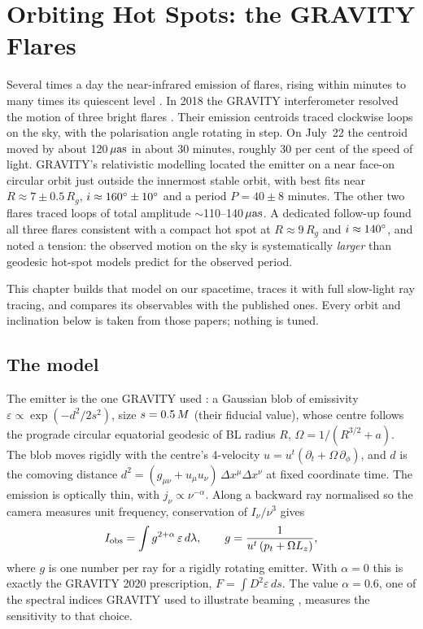 \chapter{Orbiting Hot Spots: the GRAVITY Flares}
\label{ch:xflares}

Several times a day the near-infrared emission of \sgra{} flares, rising
within minutes to many times its quiescent level \citep{Genzel2010}. In 2018
the GRAVITY interferometer resolved the motion of three bright flares
\citep{Gravity2018flares}. Their emission centroids traced clockwise loops on
the sky, with the polarisation angle rotating in step. On July~22 the
centroid moved by about 120\,$\mu\mathrm{as}$ in about 30 minutes, roughly 30 per cent
of the speed of light. GRAVITY's relativistic modelling located the emitter on
a near face-on circular orbit just outside the innermost stable orbit, with
best fits near $R \approx 7\pm0.5\,R_g$, $i \approx 160^\circ\pm10^\circ$ and a
period $P = 40\pm8$ minutes. The other two flares traced loops of total
amplitude $\sim$110--140\,$\mu\mathrm{as}$. A dedicated follow-up
\citep{Gravity2020flares} found all three flares consistent with a compact
hot spot at $R \approx 9\,R_g$ and $i \approx 140^\circ$, and noted a tension:
the observed motion on the sky is systematically \emph{larger} than geodesic
hot-spot models predict for the observed period.

This chapter builds that model on our \sgra{} spacetime, traces it with full
slow-light ray tracing, and compares its observables with the published
ones. Every orbit and inclination below is taken from those papers; nothing
is tuned.

\section{The model}

The emitter is the one GRAVITY used \citep[][following
\citealt{BroderickLoeb2006, Hamaus2009}]{Gravity2020flares}: a Gaussian blob
of emissivity $\varepsilon \propto \exp(-d^2/2s^2)$, size $s = 0.5\,M$
(their fiducial value), whose centre follows the prograde circular equatorial
geodesic of BL radius $R$, $\Omega = 1/(R^{3/2} + a)$. The blob moves rigidly
with the centre's 4-velocity $u = u^t(\partial_t + \Omega\,\partial_\phi)$, and
$d$ is the comoving distance $d^2 = (g_{\mu\nu} + u_\mu u_\nu)\,\Delta x^\mu
\Delta x^\nu$ at fixed coordinate time. The emission is optically thin, with
$j_\nu \propto \nu^{-\alpha}$. Along a backward ray normalised so the camera
measures unit frequency, conservation of $I_\nu/\nu^3$ gives
\begin{equation}
I_{\rm obs} = \int g^{2+\alpha}\,\varepsilon\,d\lambda, \qquad
g = \frac{1}{u^t\,(p_t + \Omega L_z)},
\label{eq:spotintensity}
\end{equation}
where $g$ is one number per ray for a rigidly rotating emitter. With
$\alpha = 0$ this is exactly the GRAVITY 2020 prescription, $F = \int D^2
\varepsilon\,ds$. The value $\alpha = 0.6$, one of the spectral indices
GRAVITY used to illustrate beaming \citep[their Appendix
C]{Gravity2018flares}, measures the sensitivity to that choice.

